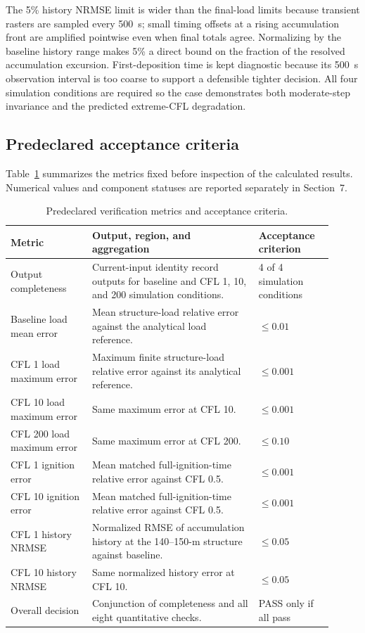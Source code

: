The 5\% history NRMSE limit is wider than the final-load limits because
transient rasters are sampled every \SI{500}{s}; small timing offsets at a
rising accumulation front are amplified pointwise even when final totals
agree.  Normalizing by the baseline history range makes 5\% a direct bound on
the fraction of the resolved accumulation excursion.  First-deposition time is
kept diagnostic because its \SI{500}{s} observation interval is too coarse to
support a defensible tighter decision.  All four simulation conditions are required so the
case demonstrates both moderate-step invariance and the predicted extreme-CFL
degradation.

\subsection{Predeclared acceptance criteria}

Table~\ref{tab:acceptance-contract} summarizes the metrics fixed before
inspection of the calculated results. Numerical values and component statuses
are reported separately in Section~7.

\begin{table}[H]
\centering
\footnotesize
\caption{Predeclared verification metrics and acceptance criteria.}
\label{tab:acceptance-contract}
\begin{tabular}{@{}p{0.23\linewidth}p{0.47\linewidth}p{0.21\linewidth}@{}}
\toprule
Metric & Output, region, and aggregation & Acceptance criterion\\
\midrule
Output completeness & Current-input identity record outputs for baseline and CFL 1, 10, and 200 simulation conditions. & 4 of 4 simulation conditions \\
Baseline load mean error & Mean structure-load relative error against the analytical load reference. & \(\le0.01\) \\
CFL 1 load maximum error & Maximum finite structure-load relative error against its analytical reference. & \(\le0.001\) \\
CFL 10 load maximum error & Same maximum error at CFL 10. & \(\le0.001\) \\
CFL 200 load maximum error & Same maximum error at CFL 200. & \(\le0.10\) \\
CFL 1 ignition error & Mean matched full-ignition-time relative error against CFL 0.5. & \(\le0.001\) \\
CFL 10 ignition error & Mean matched full-ignition-time relative error against CFL 0.5. & \(\le0.001\) \\
CFL 1 history NRMSE & Normalized RMSE of accumulation history at the 140--150-m structure against baseline. & \(\le0.05\) \\
CFL 10 history NRMSE & Same normalized history error at CFL 10. & \(\le0.05\) \\
Overall decision & Conjunction of completeness and all eight quantitative checks. & PASS only if all pass \\
\bottomrule
\end{tabular}
\end{table}

